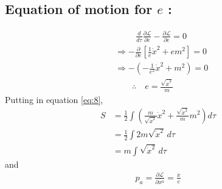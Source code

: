 \documentclass[14pt]{article} %
\begin{document}
\subsection*{Equation of motion for $e$ :}
\vspace{-1cm}
\begin{align*}
    & \quad\quad~~\frac{d}{d\tau} \frac{\partial \mathcal{L}}{\partial \dot{e}} - \frac{\partial \mathcal{L}}{\partial e} = 0 \\
    & \Rightarrow -\frac{\partial}{\partial e} \left[ \frac{1}{e} \dot{x}^2 + e m^2 \right] = 0 \\
    & \Rightarrow -\left( -\frac{1}{e^2} \dot{x}^2 + m^2 \right) = 0 \\
    & \quad\quad\therefore \quad e = \frac{\sqrt{\dot{x}^2}}{m}
\quad \tag{9} \label{eq:9}
\end{align*}
Putting in equation \eqref{eq:8},
\begin{align*}
    S &= \frac{1}{2} \int \left( \frac{m}{\sqrt{\dot{x}^2}} \dot{x}^2 + \frac{\sqrt{\dot{x}^2}}{m} m^2 \right) d\tau \\
    &= \frac{1}{2} \int 2m \sqrt{\dot{x}^2} \, d\tau \\
    &= m \int \sqrt{\dot{x}^2} \, d\tau \tag{10} \label{eq:10}
\end{align*}
and
\begin{align*}
p_a = \frac{\partial \mathcal{L}}{\partial \dot{x^a}} = \frac{\dot{x}}{e} \tag{11}
\label{eq:11}
\end{align*}
\end{document}
